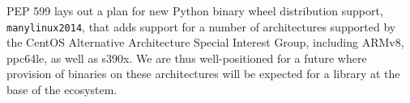 PEP 599\cite{PEP599} lays out a plan for new Python binary wheel
distribution support, \texttt{manylinux2014}, that adds
support for a number of architectures supported by the CentOS
Alternative Architecture Special Interest Group, including
ARMv8, ppc64le, as well as s390x. We are thus well-positioned
for a future where provision of binaries on these architectures
will be expected for a library at the base of the ecosystem.
